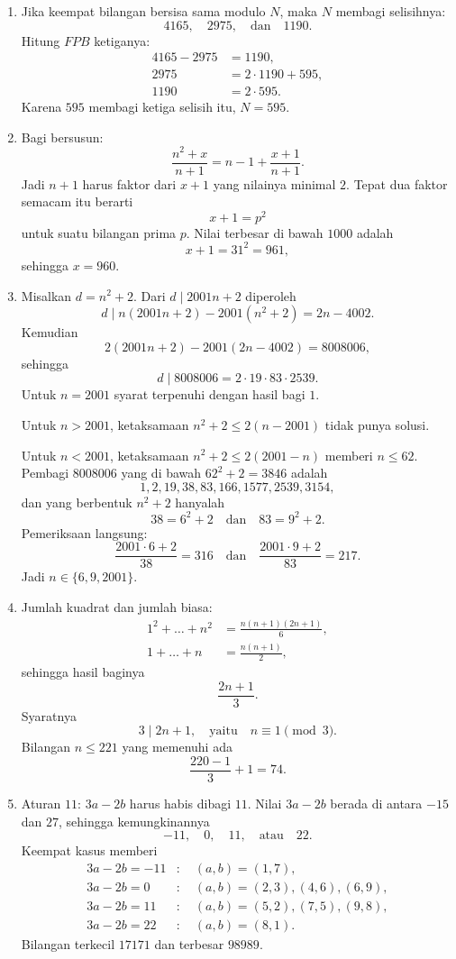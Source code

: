 \documentclass[12pt]{scrartcl}
\begin{document}
\begin{enumerate}
	\item Jika keempat bilangan bersisa sama modulo $N$,
	maka $N$ membagi selisihnya:
	\[ 4165, \quad 2975, \quad \text{dan} \quad 1190. \]
	Hitung $FPB$ ketiganya:
	\begin{align*}
	4165 - 2975 &= 1190, \\
	2975 &= 2 \cdot 1190 + 595, \\
	1190 &= 2 \cdot 595.
	\end{align*}
	Karena $595$ membagi ketiga selisih itu, $N = 595$.

	\item Bagi bersusun:
	\[ \frac{n^2+x}{n+1} = n - 1 + \frac{x+1}{n+1}. \]
	Jadi $n + 1$ harus faktor dari $x + 1$ yang nilainya minimal $2$.
	Tepat dua faktor semacam itu berarti
	\[ x + 1 = p^2 \]
	untuk suatu bilangan prima $p$.
	Nilai terbesar di bawah $1000$ adalah
	\[ x + 1 = 31^2 = 961, \]
	sehingga $x = 960$.

	\item Misalkan $d = n^2 + 2$. Dari $d \mid 2001n + 2$ diperoleh
	\[ d \mid n(2001n+2) - 2001(n^2+2) = 2n - 4002. \]
	Kemudian
	\[ 2(2001n+2) - 2001(2n-4002) = 8008006, \]
	sehingga
	\[ d \mid 8008006 = 2 \cdot 19 \cdot 83 \cdot 2539. \]
	Untuk $n = 2001$ syarat terpenuhi dengan hasil bagi $1$.

	Untuk $n > 2001$, ketaksamaan $n^2 + 2 \le 2(n - 2001)$ tidak punya solusi.

	Untuk $n < 2001$, ketaksamaan $n^2 + 2 \le 2(2001 - n)$ memberi $n \le 62$.
	Pembagi $8008006$ yang di bawah $62^2 + 2 = 3846$ adalah
	\[ 1, 2, 19, 38, 83, 166, 1577, 2539, 3154, \]
	dan yang berbentuk $n^2 + 2$ hanyalah
	\[ 38 = 6^2 + 2 \quad \text{dan} \quad 83 = 9^2 + 2. \]
	Pemeriksaan langsung:
	\[ \frac{2001 \cdot 6 + 2}{38} = 316 \quad \text{dan} \quad \frac{2001 \cdot 9 + 2}{83} = 217. \]
	Jadi $n \in \{6, 9, 2001\}$.

	\item Jumlah kuadrat dan jumlah biasa:
	\begin{align*}
	1^2 + \dots + n^2 &= \frac{n(n+1)(2n+1)}{6}, \\
	1 + \dots + n &= \frac{n(n+1)}{2},
	\end{align*}
	sehingga hasil baginya
	\[ \frac{2n+1}{3}. \]
	Syaratnya
	\[ 3 \mid 2n + 1, \quad \text{yaitu} \quad n \equiv 1 \pmod{3}. \]
	Bilangan $n \le 221$ yang memenuhi ada
	\[ \frac{220-1}{3} + 1 = 74. \]

	\item Aturan $11$: $3a - 2b$ harus habis dibagi $11$.
	Nilai $3a - 2b$ berada di antara $-15$ dan $27$,
	sehingga kemungkinannya
	\[ -11, \quad 0, \quad 11, \quad \text{atau} \quad 22. \]
	Keempat kasus memberi
	\begin{align*}
	3a - 2b = -11 &:\quad (a, b) = (1, 7), \\
	3a - 2b = 0 &:\quad (a, b) = (2, 3), (4, 6), (6, 9), \\
	3a - 2b = 11 &:\quad (a, b) = (5, 2), (7, 5), (9, 8), \\
	3a - 2b = 22 &:\quad (a, b) = (8, 1).
	\end{align*}
	Bilangan terkecil $17171$ dan terbesar $98989$.


\end{enumerate}
\end{document}
